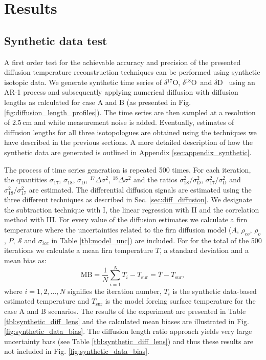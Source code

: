 \documentclass[11pt, draftcls, onecolumn]{IEEEtran} %
\numberwithin{equation}{section}
\numberwithin{table}{section}
\numberwithin{figure}{section}
\newcommand{\delOx}{$\delta{}^{18}\mathrm{O}$}
\newcommand{\delOxb}{$\delta{}^{17}\mathrm{O}$}
\newcommand{\delD}{$\delta\mathrm{D}$}
\begin{document}
\section{Results}\label{sec:results}



\subsection{Synthetic data test} \label{sec:synthetic_results}
A first order test for the achievable accuracy and precision of the presented diffusion temperature reconstruction
techniques can be performed using synthetic isotopic data. 
We generate synthetic time series of 
\delOxb, \delOx~and \delD~ using an AR-1 process and subsequently applying numerical diffusion with diffusion 
lengths as calculated for case A and B (as presented in Fig. \ref{fig:diffusion_length_profiles}).
The time series are then sampled at a resolution of $2.5\,\mathrm{cm}$ and white measurement noise is added. Eventually,
estimates of diffusion lengths for all three isotopologues are obtained using the techniques we have described 
in the previous sections. 
A more detailed description of how the synthetic data are generated is outlined in Appendix \ref{sec:appendix_synthetic}.



The process of time series generation is repeated 500 times. 
For each iteration, the quantities $\sigma_{17}$, $\sigma_{18}$,
$\sigma_\mathrm{D}$, ${}^{17}\Delta\sigma^2$, ${}^{18}\Delta\sigma^2$ and 
the ratios $\sigma^2_{18}/\sigma^2_{\mathrm{D}}$,
$\sigma^2_{17}/\sigma^2_{\mathrm{D}}$ and $\sigma^2_{18}/\sigma^2_{17}$ are estimated. 
The differential diffusion signals are estimated 
using the three different techniques as described in Sec. \ref{sec:diff_diffusion}.
We designate the subtraction technique with
I, the linear regression with II and the correlation method with III. 
For every value of the diffusion estimates we calculate a firn temperature where
the uncertainties related to the firn diffusion model ($A$, $\rho_{co}$, $\rho_o$, $P$, $\mathcal{S}$ and $\sigma_{ice}$ in Table \ref{tbl:model_unc}) are included. 
For for the total of the 500 iterations we calculate a mean firn temperature $\overline{T}$, 
a standard deviation and a mean bias as: 
\begin{equation}
\text{MB} = \frac{1}{N} \sum_{i = 1}^{N} T_i - T_{\text{sur}} = \overline{T} - T_{\text{sur}},
\end{equation}
where $i = 1,2,\dots,N$ signifies the iteration number, $T_i$ is the synthetic 
data-based estimated temperature and $T_{\text{sur}}$ is the model forcing  
surface temperature for the case A and B scenarios.
The results of the experiment are presented in Table \ref{tbl:synthetic_diff_lens} and the calculated 
mean biases are illustrated in Fig. \ref{fig:synthetic_data_bias}.
The diffusion length ratio approach yields very large uncertainty bars (see Table \ref{tbl:synthetic_diff_lens}) and thus these results are not 
included in Fig. \ref{fig:synthetic_data_bias}. 
\end{document}
